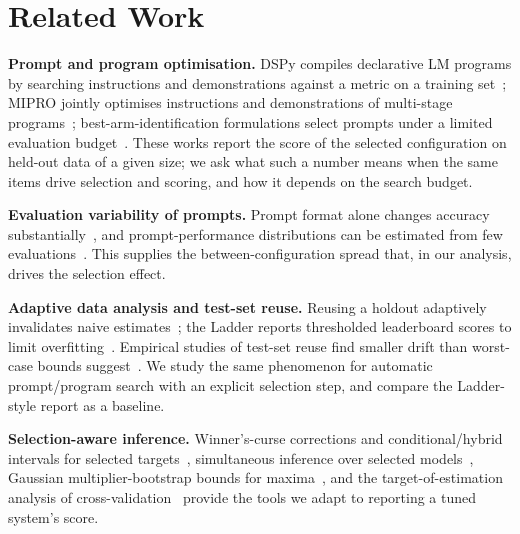 \section{Related Work}
\label{sec:related}
\textbf{Prompt and program optimisation.} DSPy compiles declarative LM programs by searching instructions and demonstrations against a metric on a training set~\citep{khattab2023dspy}; MIPRO jointly optimises instructions and demonstrations of multi-stage programs~\citep{opsahlong2024mipro}; best-arm-identification formulations select prompts under a limited evaluation budget~\citep{shi2024bai}. These works report the score of the selected configuration on held-out data of a given size; we ask what such a number means when the same items drive selection and scoring, and how it depends on the search budget.

\textbf{Evaluation variability of prompts.} Prompt format alone changes accuracy substantially~\citep{sclar2024formatting}, and prompt-performance distributions can be estimated from few evaluations~\citep{polo2024multiprompt}. This supplies the between-configuration spread that, in our analysis, drives the selection effect.

\textbf{Adaptive data analysis and test-set reuse.} Reusing a holdout adaptively invalidates naive estimates~\citep{dwork2015adaptive}; the Ladder reports thresholded leaderboard scores to limit overfitting~\citep{blum2015ladder}. Empirical studies of test-set reuse find smaller drift than worst-case bounds suggest~\citep{recht2018cifar,mania2019similarity}. We study the same phenomenon for automatic prompt/program search with an explicit selection step, and compare the Ladder-style report as a baseline.

\textbf{Selection-aware inference.} Winner's-curse corrections and conditional/hybrid intervals for selected targets~\citep{andrews2024winners}, simultaneous inference over selected models~\citep{berk2013valid}, Gaussian multiplier-bootstrap bounds for maxima~\citep{chernozhukov2013gaussian}, and the target-of-estimation analysis of cross-validation~\citep{bates2024cv} provide the tools we adapt to reporting a tuned system's score.
